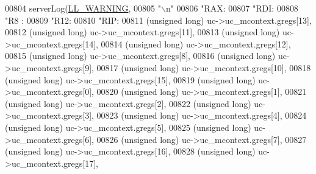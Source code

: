 \begin{DoxyCode}
{{{{{{{{{{{{{{{{{{{{{{{{{{{{{{{{{{{{{{{{{{{{{{{{{{{{{{{{{00804     serverLog(\hyperlink{server_8h_a31229b9334bba7d6be2a72970967a14b}{LL\_WARNING},
00805     \textcolor{stringliteral}{"\(\backslash\)n"}
00806     \textcolor{stringliteral}{"RAX:%
00807     \textcolor{stringliteral}{"RDI:%
00808     \textcolor{stringliteral}{"R8 :%
00809     \textcolor{stringliteral}{"R12:%
00810     \textcolor{stringliteral}{"RIP:%
00811         (\textcolor{keywordtype}{unsigned} \textcolor{keywordtype}{long}) uc->uc\_mcontext.gregs[13],
00812         (\textcolor{keywordtype}{unsigned} \textcolor{keywordtype}{long}) uc->uc\_mcontext.gregs[11],
00813         (\textcolor{keywordtype}{unsigned} \textcolor{keywordtype}{long}) uc->uc\_mcontext.gregs[14],
00814         (\textcolor{keywordtype}{unsigned} \textcolor{keywordtype}{long}) uc->uc\_mcontext.gregs[12],
00815         (\textcolor{keywordtype}{unsigned} \textcolor{keywordtype}{long}) uc->uc\_mcontext.gregs[8],
00816         (\textcolor{keywordtype}{unsigned} \textcolor{keywordtype}{long}) uc->uc\_mcontext.gregs[9],
00817         (\textcolor{keywordtype}{unsigned} \textcolor{keywordtype}{long}) uc->uc\_mcontext.gregs[10],
00818         (\textcolor{keywordtype}{unsigned} \textcolor{keywordtype}{long}) uc->uc\_mcontext.gregs[15],
00819         (\textcolor{keywordtype}{unsigned} \textcolor{keywordtype}{long}) uc->uc\_mcontext.gregs[0],
00820         (\textcolor{keywordtype}{unsigned} \textcolor{keywordtype}{long}) uc->uc\_mcontext.gregs[1],
00821         (\textcolor{keywordtype}{unsigned} \textcolor{keywordtype}{long}) uc->uc\_mcontext.gregs[2],
00822         (\textcolor{keywordtype}{unsigned} \textcolor{keywordtype}{long}) uc->uc\_mcontext.gregs[3],
00823         (\textcolor{keywordtype}{unsigned} \textcolor{keywordtype}{long}) uc->uc\_mcontext.gregs[4],
00824         (\textcolor{keywordtype}{unsigned} \textcolor{keywordtype}{long}) uc->uc\_mcontext.gregs[5],
00825         (\textcolor{keywordtype}{unsigned} \textcolor{keywordtype}{long}) uc->uc\_mcontext.gregs[6],
00826         (\textcolor{keywordtype}{unsigned} \textcolor{keywordtype}{long}) uc->uc\_mcontext.gregs[7],
00827         (\textcolor{keywordtype}{unsigned} \textcolor{keywordtype}{long}) uc->uc\_mcontext.gregs[16],
00828         (\textcolor{keywordtype}{unsigned} \textcolor{keywordtype}{long}) uc->uc\_mcontext.gregs[17],
}}}}}}}}}}}}}}}}}}}}}}}}}}}}}}}}}}}}}}}}}}}}}}}}}}}}}}}}}}}}}}
\end{DoxyCode}
